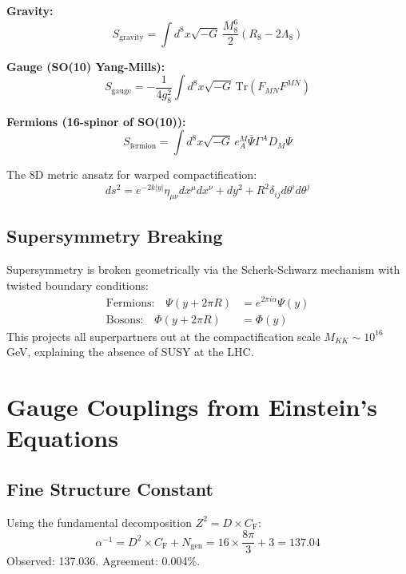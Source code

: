 \documentclass[aps,prd,twocolumn,superscriptaddress,nofootinbib]{revtex4-2}
\newcommand{\Zs}{Z^2}
\newcommand{\CF}{C_{\mathrm{F}}}
\newcommand{\Ngen}{N_{\mathrm{gen}}}
\newcommand{\alphainv}{\alpha^{-1}}
\begin{document}
\textbf{Gravity:}
\begin{equation}
S_{\mathrm{gravity}} = \int d^8x \sqrt{-G} \, \frac{M_8^6}{2} (R_8 - 2\Lambda_8)
\end{equation}

\textbf{Gauge (SO(10) Yang-Mills):}
\begin{equation}
S_{\mathrm{gauge}} = -\frac{1}{4g_8^2} \int d^8x \sqrt{-G} \, \mathrm{Tr}(F_{MN}F^{MN})
\end{equation}

\textbf{Fermions (16-spinor of SO(10)):}
\begin{equation}
S_{\mathrm{fermion}} = \int d^8x \sqrt{-G} \, e_A^M \bar{\Psi} \Gamma^A D_M \Psi
\end{equation}

The 8D metric ansatz for warped compactification:
\begin{equation}
ds^2 = e^{-2k|y|}\eta_{\mu\nu}dx^\mu dx^\nu + dy^2 + R^2 \delta_{ij} d\theta^i d\theta^j
\end{equation}

\subsection{Supersymmetry Breaking}

Supersymmetry is broken geometrically via the Scherk-Schwarz mechanism with twisted boundary conditions:
\begin{align}
\text{Fermions:} \quad \Psi(y + 2\pi R) &= e^{2\pi i \alpha} \Psi(y) \\
\text{Bosons:} \quad \Phi(y + 2\pi R) &= \Phi(y)
\end{align}
This projects all superpartners out at the compactification scale $M_{KK} \sim 10^{16}$ GeV, explaining the absence of SUSY at the LHC.

\section{Gauge Couplings from Einstein's Equations}
\label{sec:gauge}

\subsection{Fine Structure Constant}

\begin{theorem}[$\alphainv$ from $D$, $\CF$, $\Ngen$]
Using the fundamental decomposition $\Zs = D \times \CF$:
\begin{equation}
\alphainv = D^2 \times \CF + \Ngen = 16 \times \frac{8\pi}{3} + 3 = 137.04
\end{equation}
Observed: 137.036. Agreement: 0.004\%.
\end{theorem}
\end{document}
